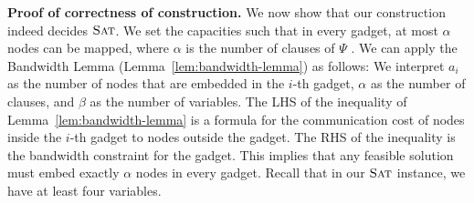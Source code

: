 \documentclass[preprint,12pt]{elsarticle}
\newcommand{\clauses}{\alpha}
\newcommand{\variables}{\beta}
\newcommand{\SAT}{\textsc{Sat}}
\newcommand{\Formula}{\ensuremath{\Psi}}
\begin{document}
\textbf{Proof of correctness of construction.}
We now show that our construction indeed
decides $\SAT$. We set the capacities such that in every gadget,
at most $\clauses$ nodes can be mapped, where $\clauses$
is the number of clauses of $\Formula$
.
We can apply the Bandwidth Lemma (Lemma~\ref{lem:bandwidth-lemma}) as follows:
We interpret $a_i$ as the
number of nodes that are embedded in the $i$-th gadget, $\clauses$
as the number
of clauses, and $\variables$ as the number of variables.
The LHS of the inequality of Lemma~\ref{lem:bandwidth-lemma}
is a formula for the communication cost of nodes inside the $i$-th
gadget to nodes outside the gadget. The RHS of the inequality is the
bandwidth constraint for the gadget. This implies that
any feasible solution must embed exactly $\clauses$ nodes in every gadget.
Recall that in our $\SAT$ instance, we have at least four variables.
\end{document}
